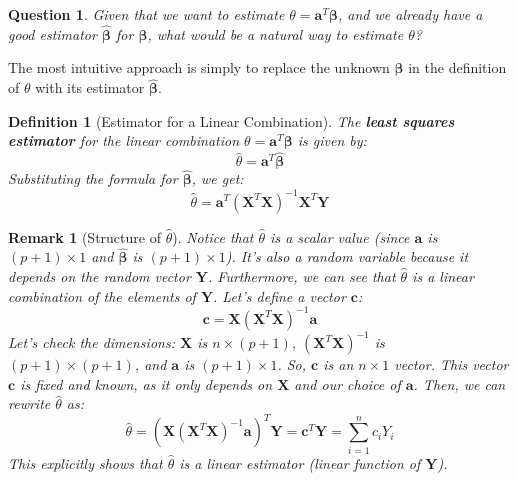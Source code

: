 \documentclass[11pt]{article}
\theoremstyle{mytheoremstyle}
\theoremstyle{mydefinitionstyle}
\newtheorem{definition}[theorem]{Definition}
\newtheorem{remark}[theorem]{Remark}
\newtheorem{question}[theorem]{Question}
\newcommand{\vect}[1]{\mathbf{#1}}
\begin{document}
\begin{question}
Given that we want to estimate $\theta = \vect{a}^T \vect{\beta}$, and we already have a good estimator $\hat{\vect{\beta}}$ for $\vect{\beta}$, what would be a natural way to estimate $\theta$?
\end{question}

The most intuitive approach is simply to replace the unknown $\vect{\beta}$ in the definition of $\theta$ with its estimator $\hat{\vect{\beta}}$.

\begin{definition}[Estimator for a Linear Combination]
The \textbf{least squares estimator} for the linear combination $\theta = \vect{a}^T \vect{\beta}$ is given by:
\begin{equation*}
\hat{\theta} = \vect{a}^T \hat{\vect{\beta}}
\end{equation*}
Substituting the formula for $\hat{\vect{\beta}}$, we get:
\begin{equation*}
\hat{\theta} = \vect{a}^T (\vect{X}^T \vect{X})^{-1} \vect{X}^T \vect{Y}
\end{equation*}
\end{definition}

\begin{remark}[Structure of $\hat{\theta}$]
Notice that $\hat{\theta}$ is a scalar value (since $\vect{a}$ is $(p+1)\times 1$ and $\hat{\vect{\beta}}$ is $(p+1)\times 1$). It's also a random variable because it depends on the random vector $\vect{Y}$. Furthermore, we can see that $\hat{\theta}$ is a linear combination of the elements of $\vect{Y}$. Let's define a vector $\vect{c}$:
\begin{equation*}
\vect{c} = \vect{X} (\vect{X}^T \vect{X})^{-1} \vect{a}
\end{equation*}
Let's check the dimensions: $\vect{X}$ is $n \times (p+1)$, $(\vect{X}^T \vect{X})^{-1}$ is $(p+1) \times (p+1)$, and $\vect{a}$ is $(p+1) \times 1$. So, $\vect{c}$ is an $n \times 1$ vector. This vector $\vect{c}$ is fixed and known, as it only depends on $\vect{X}$ and our choice of $\vect{a}$.
Then, we can rewrite $\hat{\theta}$ as:
\begin{equation*}
\hat{\theta} = (\vect{X} (\vect{X}^T \vect{X})^{-1} \vect{a})^T \vect{Y} = \vect{c}^T \vect{Y} = \sum_{i=1}^n c_i Y_i
\end{equation*}
This explicitly shows that $\hat{\theta}$ is a linear estimator (linear function of $\vect{Y}$).
\end{remark}
\end{document}
